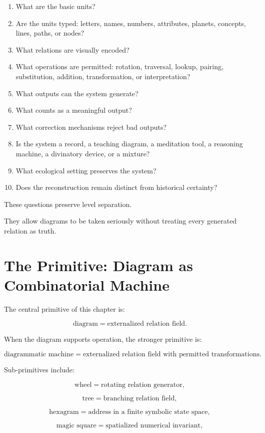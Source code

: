 \documentclass[11pt]{book}
\begin{document}
\begin{enumerate}[label=\arabic*.]
    \item What are the basic units?
    \item Are the units typed: letters, names, numbers, attributes, planets, concepts, lines, paths, or nodes?
    \item What relations are visually encoded?
    \item What operations are permitted: rotation, traversal, lookup, pairing, substitution, addition, transformation, or interpretation?
    \item What outputs can the system generate?
    \item What counts as a meaningful output?
    \item What correction mechanisms reject bad outputs?
    \item Is the system a record, a teaching diagram, a meditation tool, a reasoning machine, a divinatory device, or a mixture?
    \item What ecological setting preserves the system?
    \item Does the reconstruction remain distinct from historical certainty?
\end{enumerate}

These questions preserve level separation.

They allow diagrams to be taken seriously without treating every generated relation as truth.

\section{The Primitive: Diagram as Combinatorial Machine}

The central primitive of this chapter is:

\[
\text{diagram} = \text{externalized relation field}.
\]

When the diagram supports operation, the stronger primitive is:

\[
\text{diagrammatic machine} = \text{externalized relation field with permitted transformations}.
\]

Sub-primitives include:

\[
\text{wheel} = \text{rotating relation generator},
\]

\[
\text{tree} = \text{branching relation field},
\]

\[
\text{hexagram} = \text{address in a finite symbolic state space},
\]

\[
\text{magic square} = \text{spatialized numerical invariant},
\]
\end{document}
